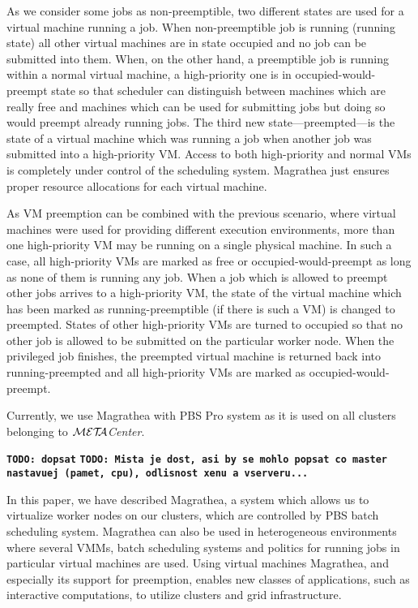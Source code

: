 \documentclass[times,10pt,twocolumn]{article}
\def\META#1{\textit{${\cal MET\!\!A}$#1}}
\def\TODO#1{\texttt{\bf {TODO:} #1}}
\begin{document}
As we consider some jobs as non-preemptible, two different states are used for
a virtual machine running a job. When non-preemptible job is running (running
state) all other virtual machines are in state occupied and no job can be
submitted into them. When, on the other hand, a preemptible job is running
within a normal virtual machine, a high-priority one is in
occupied-would-preempt state so that scheduler can distinguish between
machines which are really free and machines which can be used for submitting
jobs but doing so would preempt already running jobs. The third new
state---preempted---is the state of a virtual machine which was running a job
when another job was submitted into a high-priority VM. Access to both
high-priority and normal VMs is completely under control of the scheduling
system. Magrathea just ensures proper resource allocations for each virtual
machine.

As VM preemption can be combined with the previous scenario, where virtual
machines were used for providing different execution environments, more than
one high-priority VM may be running on a single physical machine. In such a
case, all high-priority VMs are marked as free or occupied-would-preempt as
long as none of them is running any job. When a job which is allowed to
preempt other jobs arrives to a high-priority VM, the state of the virtual
machine which has been marked as running-preemptible (if there is such a VM)
is changed to preempted. States of other high-priority VMs are turned to
occupied so that no other job is allowed to be submitted on the particular
worker node. When the privileged job finishes, the preempted virtual machine
is returned back into running-preempted and all high-priority VMs are marked
as occupied-would-preempt.


\label{sec:deployment}

Currently, we use Magrathea with PBS Pro system as it is used on all
clusters belonging to \META{Center}.

\TODO{dopsat}
\TODO{Mista je dost, asi by se mohlo popsat co master nastavuej (pamet, cpu), odlisnost
xenu a vserveru...}



In this paper, we have described Magrathea, a system which allows us to
virtualize worker nodes on our clusters, which are controlled by PBS batch
scheduling system. Magrathea can also be used in heterogeneous environments
where several VMMs, batch scheduling systems and politics for running jobs in
particular virtual machines are used. Using virtual machines Magrathea, and
especially its support for preemption, enables new classes of applications,
such as interactive computations, to utilize clusters and grid infrastructure.
\end{document}
